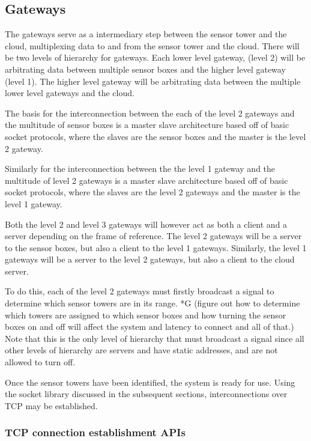 \documentclass[paper=a4, fontsize=12pt]{scrartcl}
\numberwithin{equation}{section}		%
\numberwithin{figure}{section}			%
\numberwithin{table}{section}				%
\begin{document}

\subsection{Gateways}
The gateways serve as a intermediary step between the sensor tower and the cloud, multiplexing data to and from the sensor tower and the cloud. There will be two levels of hierarchy for gateways. Each lower level gateway, (level 2) will be arbitrating data between multiple sensor boxes and the higher level gateway (level 1). The higher level gateway will be arbitrating data between the multiple lower level gateways and the cloud.

The basis for the interconnection between the each of the level 2 gateways and the multitude of sensor boxes is a master slave architecture based off of basic socket protocols, where the slaves are the sensor boxes and the master is the level 2 gateway. 

Similarly for the interconnection between the the level 1 gateway and the multitude of level 2 gateways is a master slave architecture based off of basic socket protocols, where the slaves are the level 2 gateways and the master is the level 1 gateway. 

Both the level 2 and level 3 gateways will however act as both a client and a server depending on the frame of reference. The level 2 gateways will be a server to the sensor boxes, but also a client to the level 1 gateways. Similarly, the level 1 gateways will be a server to the level 2 gateways, but also a client to the cloud server. 

To do this, each of the level 2 gateways must firstly broadcast a signal to determine which sensor towers are in its range. *G (figure out how to determine which towers are assigned to which sensor boxes and how turning the sensor boxes on and off will affect the system and latency to connect and all of that.) Note that this is the only level of hierarchy that must broadcast a signal since all other levels of hierarchy are servers and have static addresses, and are not allowed to turn off.

Once the sensor towers have been identified, the system is ready for use. Using the socket library discussed in the subsequent sections, interconnections over TCP may be established. 

\subsubsection{TCP connection establishment APIs}
\end{document}

